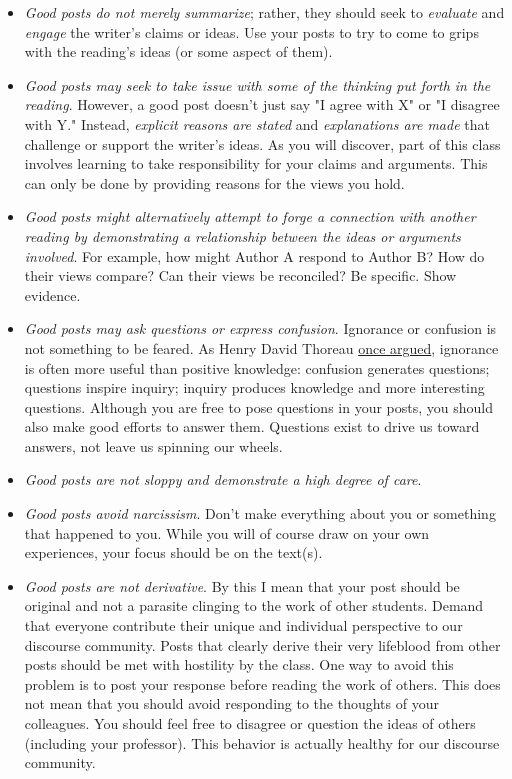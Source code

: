 \documentclass[letterpaper]{article}
\begin{document}
\begin{itemize}
\item \emph{Good posts do not merely summarize}; rather, they should seek to \emph{evaluate} and \emph{engage} the writer's claims or ideas. Use your posts to try to come to grips with the reading's ideas (or some aspect of them).

\item \emph{Good posts may seek to take issue with some of the thinking put forth in the reading}. However, a good post doesn't just say "I agree with X" or "I disagree with Y." Instead, \emph{explicit reasons are stated} and \emph{explanations are made} that challenge or support the writer's ideas. As you will discover, part of this class involves learning to take responsibility for your claims and arguments. This can only be done by providing reasons for the views you hold.

\item \emph{Good posts might alternatively attempt to forge a connection with another reading by demonstrating a relationship between the ideas or arguments involved}. For example, how might Author A respond to Author B? How do their views compare? Can their views be reconciled? Be specific. Show evidence.

\item \emph{Good posts may ask questions or express confusion}. Ignorance or confusion is not something to be feared. As Henry David Thoreau \href{https://www.gutenberg.org/files/1022/1022-h/1022-h.htm}{once argued}, ignorance is often more useful than positive knowledge: confusion generates questions; questions inspire inquiry; inquiry produces knowledge and more interesting questions. Although you are free to pose questions in your posts, you should also make good efforts to answer them. Questions exist to drive us toward answers, not leave us spinning our wheels.

\item \emph{Good posts are not sloppy and demonstrate a high degree of care}.

\item \emph{Good posts avoid narcissism}. Don't make everything about you or something that happened to you. While you will of course draw on your own experiences, your focus should be on the text(s).

\item \emph{Good posts are not derivative}. By this I mean that your post should be original and not a parasite clinging to the work of other students. Demand that everyone contribute their unique and individual perspective to our discourse community. Posts that clearly derive their very lifeblood from other posts should be met with hostility by the class. One way to avoid this problem is to post your response before reading the work of others. This does not mean that you should avoid responding to the thoughts of your colleagues. You should feel free to disagree or question the ideas of others (including your professor). This behavior is actually healthy for our discourse community.


\end{itemize}
\end{document}
